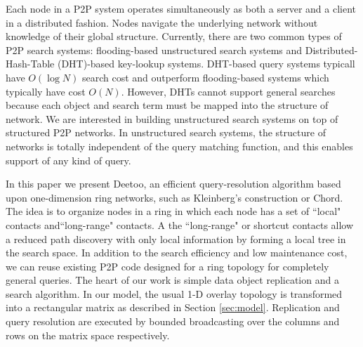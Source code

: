 \documentclass[9.5pt,journal,final,finalsubmission,twocolumn]{IEEEtran}
\begin{document}
Each node in a P2P system operates simultaneously as both a server and a client
in a distributed fashion. Nodes navigate the
underlying network without knowledge of their global structure. 
Currently, there are two common types of P2P search systems: flooding-based
unstructured search systems and Distributed-Hash-Table (DHT)-based key-lookup systems. 
DHT-based query systems typicall have $O(\log N)$ search cost and outperform 
flooding-based systems which typically have cost $O(N)$.
However, DHTs cannot support general searches because each object
and search term must be mapped into the structure of network.
We are interested in building unstructured search systems on top of 
structured P2P networks. In unstructured search systems, 
the structure of networks is totally independent of the query matching 
function, and this enables support of any kind of query.  

In this paper we present Deetoo, an efficient query-resolution 
algorithm based upon one-dimension ring networks,
such as Kleinberg's construction
\cite{jk:Algorithmic} or Chord\cite{is:Chord}.
The idea is to organize nodes in a ring in which 
each node has a set of ``local" contacts and``long-range" 
contacts. 
A the ``long-range" or shortcut contacts allow a reduced path discovery 
with only local information by forming a local tree in the search space. 
In addition to the search efficiency and low maintenance cost, 
we can reuse existing P2P code designed for a ring topology for completely
general queries.
The heart of our work is simple data object replication and a search 
algorithm. In our model, the usual 1-D
overlay topology is transformed into a rectangular 
matrix as described in Section \ref{sec:model}.  Replication and 
query resolution are executed by bounded broadcasting over the 
columns and rows on the matrix space respectively.
\end{document}
